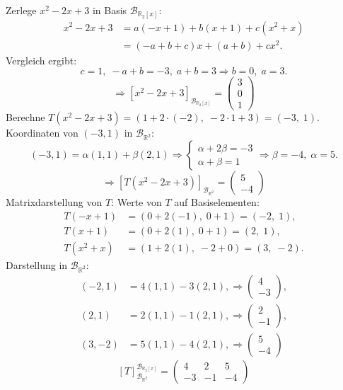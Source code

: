 \documentclass{article}
\begin{document}
Zerlege \(x^2 - 2x + 3\) in Basis \(\mathcal{B}_{\mathbb{R}_2[x]}\):
\begin{align*}
x^2 - 2x + 3 &= a(-x+1) + b(x+1) + c(x^2+x) \\
&= (-a + b + c)x + (a + b) + cx^2.
\end{align*}
Vergleich ergibt:
\[
c = 1,\; -a + b = -3,\; a + b = 3 \Rightarrow b = 0,\; a = 3.
\]
\[
\Rightarrow [x^2 - 2x + 3]_{\mathcal{B}_{\mathbb{R}_2[x]}} = \begin{pmatrix} 3 \\ 0 \\ 1 \end{pmatrix}
\]
Berechne \(T(x^2 - 2x + 3) = (1 + 2 \cdot (-2),\; -2 \cdot 1 + 3) = (-3,\; 1)\).\\
Koordinaten von \((-3,1)\) in \(\mathcal{B}_{\mathbb{R}^2}\):
\[
(-3,1) = \alpha(1,1) + \beta(2,1) \Rightarrow
\begin{cases}
\alpha + 2\beta = -3 \\
\alpha + \beta = 1
\end{cases}
\Rightarrow \beta = -4,\; \alpha = 5.
\]
\[
\Rightarrow [T(x^2 - 2x + 3)]_{\mathcal{B}_{\mathbb{R}^2}} = \begin{pmatrix} 5 \\ -4 \end{pmatrix}
\]
Matrixdarstellung von \(T\): Werte von \(T\) auf Basiselementen:
\begin{align*}
T(-x+1) &= (0 + 2(-1),\; 0 + 1) = (-2,\;1), \\
T(x+1) &= (0 + 2(1),\; 0 + 1) = (2,\;1), \\
T(x^2+x) &= (1 + 2(1),\; -2 + 0) = (3,\;-2).
\end{align*}
Darstellung in \(\mathcal{B}_{\mathbb{R}^2}\):
\begin{align*}
(-2,1) &= 4(1,1) -3(2,1), \Rightarrow \begin{pmatrix}4\\-3\end{pmatrix}, \\
(2,1) &= 2(1,1) -1(2,1), \Rightarrow \begin{pmatrix}2\\-1\end{pmatrix}, \\
(3,-2) &= 5(1,1) -4(2,1), \Rightarrow \begin{pmatrix}5\\-4\end{pmatrix}
\end{align*}
\[
[T]_{\mathcal{B}_{\mathbb{R}^2}}^{\mathcal{B}_{\mathbb{R}_2[x]}} =
\begin{pmatrix}
4 & 2 & 5 \\
-3 & -1 & -4
\end{pmatrix}
\]
\end{document}
